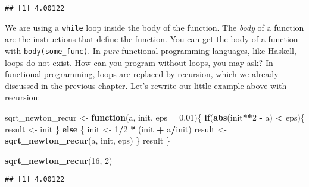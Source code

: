 \documentclass[
]{article}
\newenvironment{Shaded}{\begin{snugshade}}{\end{snugshade}}
\newcommand{\ControlFlowTok}[1]{\textcolor[rgb]{0.13,0.29,0.53}{\textbf{#1}}}
\newcommand{\DataTypeTok}[1]{\textcolor[rgb]{0.13,0.29,0.53}{#1}}
\newcommand{\DecValTok}[1]{\textcolor[rgb]{0.00,0.00,0.81}{#1}}
\newcommand{\FloatTok}[1]{\textcolor[rgb]{0.00,0.00,0.81}{#1}}
\newcommand{\KeywordTok}[1]{\textcolor[rgb]{0.13,0.29,0.53}{\textbf{#1}}}
\newcommand{\NormalTok}[1]{#1}
\newcommand{\OperatorTok}[1]{\textcolor[rgb]{0.81,0.36,0.00}{\textbf{#1}}}
\newcommand{\StringTok}[1]{\textcolor[rgb]{0.31,0.60,0.02}{#1}}
\begin{document}
\begin{verbatim}
## [1] 4.00122
\end{verbatim}

We are using a \texttt{while} loop inside the body of the function. The \emph{body} of a function are the
instructions that define the function. You can get the body of a function with \texttt{body(some\_func)}.
In \emph{pure} functional programming languages, like Haskell, loops do not exist. How can you
program without loops, you may ask? In functional programming, loops are replaced by recursion,
which we already discussed in the previous chapter. Let's rewrite our little example above
with recursion:

\begin{Shaded}
\begin{Highlighting}[]
\NormalTok{sqrt\_newton\_recur \textless{}{-}}\StringTok{ }\ControlFlowTok{function}\NormalTok{(a, init, }\DataTypeTok{eps =} \FloatTok{0.01}\NormalTok{)\{}
    \ControlFlowTok{if}\NormalTok{(}\KeywordTok{abs}\NormalTok{(init}\OperatorTok{**}\DecValTok{2} \OperatorTok{{-}}\StringTok{ }\NormalTok{a) }\OperatorTok{\textless{}}\StringTok{ }\NormalTok{eps)\{}
\NormalTok{        result \textless{}{-}}\StringTok{ }\NormalTok{init}
\NormalTok{    \} }\ControlFlowTok{else}\NormalTok{ \{}
\NormalTok{        init \textless{}{-}}\StringTok{ }\DecValTok{1}\OperatorTok{/}\DecValTok{2} \OperatorTok{*}\StringTok{ }\NormalTok{(init }\OperatorTok{+}\StringTok{ }\NormalTok{a}\OperatorTok{/}\NormalTok{init)}
\NormalTok{        result \textless{}{-}}\StringTok{ }\KeywordTok{sqrt\_newton\_recur}\NormalTok{(a, init, eps)}
\NormalTok{    \}}
\NormalTok{    result}
\NormalTok{\}}
\end{Highlighting}
\end{Shaded}

\begin{Shaded}
\begin{Highlighting}[]
\KeywordTok{sqrt\_newton\_recur}\NormalTok{(}\DecValTok{16}\NormalTok{, }\DecValTok{2}\NormalTok{)}
\end{Highlighting}
\end{Shaded}

\begin{verbatim}
## [1] 4.00122
\end{verbatim}
\end{document}
